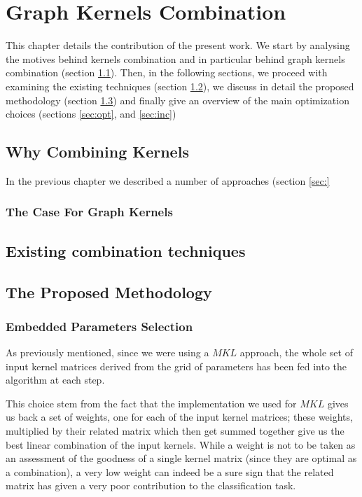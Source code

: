 \chapter{Graph Kernels Combination}
\label{Chapter3}

This chapter details the contribution of the present work.
We start by analysing the motives behind kernels combination and in particular
behind graph kernels combination (section \ref{sec:why}).
Then, in the following sections, we proceed with examining the existing techniques
(section \ref{sec:tech}), we discuss in detail the proposed methodology (section
\ref{sec:meth}) and finally give an overview of the main optimization choices (sections
\ref{sec:opt}, and \ref{sec:inc})

\section{Why Combining Kernels}
\label{sec:why}

In the previous chapter we described a number of approaches (section \ref{sec:}

\subsection{The Case For Graph Kernels}

\section{Existing combination techniques}
\label{sec:tech}

\section{The Proposed Methodology}
\label{sec:meth}
 
\subsection{Embedded Parameters Selection}
\label{subsec:parameters}

As previously mentioned, since we were using a $MKL$ approach, the whole set of
input kernel matrices derived from the grid of parameters has been fed into the
algorithm at each step.

This choice stem from the fact that the implementation we used for $MKL$ gives us
back a set of weights, one for each of the input kernel matrices; these weights,
multiplied by their related matrix which then get summed together give us the
best linear combination of the input kernels.
While a weight is not to be taken as an assessment of the goodness of a single
kernel matrix (since they are optimal as a combination), a very low weight can
indeed be a sure sign that the related matrix has given a very poor contribution
to the classification task.

